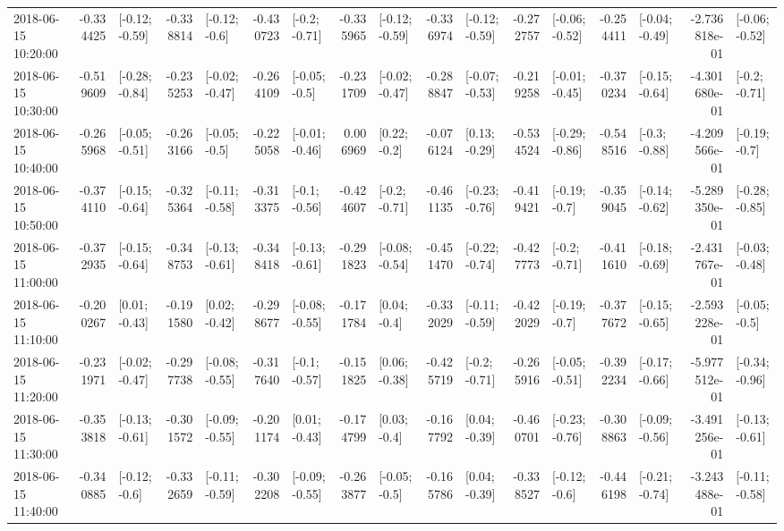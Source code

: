 \begin{tabular}{lrlrlrlrlrlrlrlrl}
2018-06-15 10:20:00 & -0.334425 &  [-0.12; -0.59] & -0.338814 &   [-0.12; -0.6] & -0.430723 &   [-0.2; -0.71] & -0.335965 &  [-0.12; -0.59] & -0.336974 &  [-0.12; -0.59] & -0.272757 &  [-0.06; -0.52] & -0.254411 &  [-0.04; -0.49] & -2.736818e-01 &  [-0.06; -0.52] \\
2018-06-15 10:30:00 & -0.519609 &  [-0.28; -0.84] & -0.235253 &  [-0.02; -0.47] & -0.264109 &   [-0.05; -0.5] & -0.231709 &  [-0.02; -0.47] & -0.288847 &  [-0.07; -0.53] & -0.219258 &  [-0.01; -0.45] & -0.370234 &  [-0.15; -0.64] & -4.301680e-01 &   [-0.2; -0.71] \\
2018-06-15 10:40:00 & -0.265968 &  [-0.05; -0.51] & -0.263166 &   [-0.05; -0.5] & -0.225058 &  [-0.01; -0.46] &  0.006969 &    [0.22; -0.2] & -0.076124 &   [0.13; -0.29] & -0.534524 &  [-0.29; -0.86] & -0.548516 &   [-0.3; -0.88] & -4.209566e-01 &   [-0.19; -0.7] \\
2018-06-15 10:50:00 & -0.374110 &  [-0.15; -0.64] & -0.325364 &  [-0.11; -0.58] & -0.313375 &   [-0.1; -0.56] & -0.424607 &   [-0.2; -0.71] & -0.461135 &  [-0.23; -0.76] & -0.419421 &   [-0.19; -0.7] & -0.359045 &  [-0.14; -0.62] & -5.289350e-01 &  [-0.28; -0.85] \\
2018-06-15 11:00:00 & -0.372935 &  [-0.15; -0.64] & -0.348753 &  [-0.13; -0.61] & -0.348418 &  [-0.13; -0.61] & -0.291823 &  [-0.08; -0.54] & -0.451470 &  [-0.22; -0.74] & -0.427773 &   [-0.2; -0.71] & -0.411610 &  [-0.18; -0.69] & -2.431767e-01 &  [-0.03; -0.48] \\
2018-06-15 11:10:00 & -0.200267 &   [0.01; -0.43] & -0.191580 &   [0.02; -0.42] & -0.298677 &  [-0.08; -0.55] & -0.171784 &    [0.04; -0.4] & -0.332029 &  [-0.11; -0.59] & -0.422029 &   [-0.19; -0.7] & -0.377672 &  [-0.15; -0.65] & -2.593228e-01 &   [-0.05; -0.5] \\
2018-06-15 11:20:00 & -0.231971 &  [-0.02; -0.47] & -0.297738 &  [-0.08; -0.55] & -0.317640 &   [-0.1; -0.57] & -0.151825 &   [0.06; -0.38] & -0.425719 &   [-0.2; -0.71] & -0.265916 &  [-0.05; -0.51] & -0.392234 &  [-0.17; -0.66] & -5.977512e-01 &  [-0.34; -0.96] \\
2018-06-15 11:30:00 & -0.353818 &  [-0.13; -0.61] & -0.301572 &  [-0.09; -0.55] & -0.201174 &   [0.01; -0.43] & -0.174799 &    [0.03; -0.4] & -0.167792 &   [0.04; -0.39] & -0.460701 &  [-0.23; -0.76] & -0.308863 &  [-0.09; -0.56] & -3.491256e-01 &  [-0.13; -0.61] \\
2018-06-15 11:40:00 & -0.340885 &   [-0.12; -0.6] & -0.332659 &  [-0.11; -0.59] & -0.302208 &  [-0.09; -0.55] & -0.263877 &   [-0.05; -0.5] & -0.165786 &   [0.04; -0.39] & -0.338527 &   [-0.12; -0.6] & -0.446198 &  [-0.21; -0.74] & -3.243488e-01 &  [-0.11; -0.58] \\

\end{tabular}
